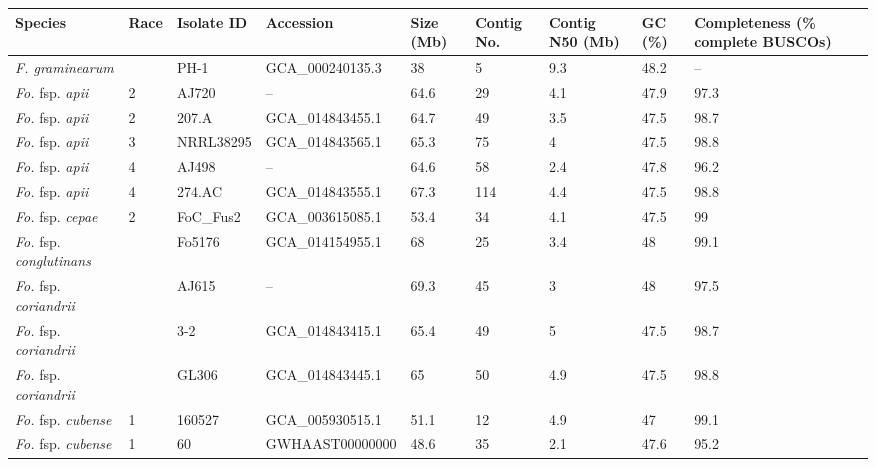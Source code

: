 \begin{ThreePartTable}
\begin{longtable}[c]{@{}C{2.5cm}C{0.8cm}C{2cm}C{2.8cm}C{1cm}C{1cm}C{1.5cm}C{0.7cm}C{2.5cm}@{}}
\label{tab:GenomeDB}\\
\toprule
\textbf{Species} &
  \textbf{Race} &
  \textbf{Isolate ID} &
  \textbf{Accession} &
  \textbf{Size (Mb)} &
  \textbf{Contig No.} &
  \textbf{Contig N50 (Mb)} &
  \textbf{GC (\%)} &
  \textbf{Completeness (\% complete BUSCOs)} \\* \midrule
\endhead
%
\bottomrule
\endfoot
%
\endlastfoot
%
\textit{F. graminearum}        &     & PH-1         & GCA\_000240135.3 & 38   & 5     & 9.3  & 48.2 &--    \\
\textit{Fo.} fsp. \textit{apii}         & 2   & AJ720        &--             & 64.6 & 29    & 4.1  & 47.9 & 97.3 \\
\textit{Fo.} fsp. \textit{apii}         & 2   & 207.A        & GCA\_014843455.1 & 64.7 & 49    & 3.5  & 47.5 & 98.7 \\
\textit{Fo.} fsp. \textit{apii}         & 3   & NRRL38295    & GCA\_014843565.1 & 65.3 & 75    & 4    & 47.5 & 98.8 \\
\textit{Fo.} fsp. \textit{apii}         & 4   & AJ498        & --             & 64.6 & 58    & 2.4  & 47.8 & 96.2 \\
\textit{Fo.} fsp. \textit{apii}         & 4   & 274.AC       & GCA\_014843555.1 & 67.3 & 114   & 4.4  & 47.5 & 98.8 \\
\textit{Fo.} fsp. \textit{cepae}        & 2   & FoC\_Fus2    & GCA\_003615085.1 & 53.4 & 34    & 4.1  & 47.5 & 99   \\
\textit{Fo.} fsp. \textit{conglutinans} &     & Fo5176       & GCA\_014154955.1 & 68   & 25    & 3.4  & 48   & 99.1 \\
\textit{Fo.} fsp. \textit{coriandrii}   &     & AJ615        &--             & 69.3 & 45    & 3    & 48   & 97.5 \\
\textit{Fo.} fsp. \textit{coriandrii}   &     & 3-2          & GCA\_014843415.1 & 65.4 & 49    & 5    & 47.5 & 98.7 \\
\textit{Fo.} fsp. \textit{coriandrii}   &     & GL306        & GCA\_014843445.1 & 65   & 50    & 4.9  & 47.5 & 98.8 \\
\textit{Fo.} fsp. \textit{cubense}      & 1   & 160527       & GCA\_005930515.1 & 51.1 & 12    & 4.9  & 47   & 99.1 \\
\textit{Fo.} fsp. \textit{cubense}      & 1   & 60           & GWHAAST00000000  & 48.6 & 35    & 2.1  & 47.6 & 95.2 \\

\end{longtable}
\end{ThreePartTable}
